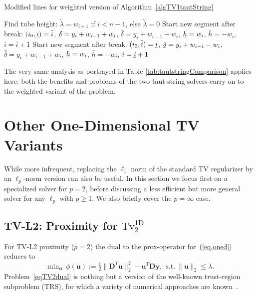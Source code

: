 \documentclass[twoside,11pt]{article}
\newcommand{\vu}{\bm{u}}       \newcommand{\vuh}{\hat{\bm{u}}}        \newcommand{\uh}{\hat{u}}    \newcommand{\vut}{\tilde{\bm{u}}}       \newcommand{\ut}{\tilde{u}}
\newcommand{\vy}{\bm{y}}       \newcommand{\vyh}{\hat{\bm{y}}}        \newcommand{\yh}{\hat{y}}    \newcommand{\vyt}{\tilde{\bm{y}}}       \newcommand{\yt}{\tilde{y}}
\newcommand{\md}{\bm{D}}
\newcommand{\mynorm}[2]{\| {#1} \|_{#2}}
\newcommand{\norm}[2]{\mynorm{#1}{#2}}
\newcommand{\enorm}[1]{\mynorm{#1}{2}}
\newcommand{\nlmin}{\min\nolimits}
\newcommand{\half}{\tfrac{1}{2}}
\newcommand{\tvell}{\text{Tv}}
\newcommand{\oned}{\text{1D}}
\newcommand{\ubar}[1]{\underaccent{\bar}{#1}}
\numberwithin{equation}{section}
\numberwithin{theorem}{section}
\begin{document}
\begin{algorithm}[htp]\small
 \caption{\small Modified lines for weighted version of Algorithm~\ref{algTV1tautString}}
 \label{algTV1tautStringWeighted}
 \begin{algorithmic}[1]
   \makeatletter
   \setcounter{ALG@line}{2}
   \makeatother
   \State\hskip12pt Find tube height: $\tilde \lambda = w_{i+1}$ if $i < n-1$, else $\tilde \lambda = 0$
   \makeatletter
   \setcounter{ALG@line}{7}
   \makeatother
     \State\hskip12pt Start new segment after break: $(i_0, \ubar i) = \bar i$, $\ubar \delta = y_i + w_{i-1} + w_i$, $\bar \delta = y_i + w_{i-1} - w_i$, $\ubar h = w_i$, $\bar h = -w_i$, $i = \bar i+1$
   \makeatletter
   \setcounter{ALG@line}{14}
   \makeatother
     \State\hskip12pt Start new segment after break: $(i_0, \bar i) = \ubar i$, $\ubar \delta = y_i + w_{i-1} - w_i$, $\bar \delta = y_i + w_{i-1} + w_i$, $\ubar h = w_i$, $\bar h = -w_i$, $i = \ubar i + 1$
 \end{algorithmic}
\end{algorithm}

The very same analysis as portrayed in Table \ref{tab:tautstringComparison} applies here: both the benefits and problems of the two taut-string solvers carry on to the weighted variant of the problem.

\section{Other One-Dimensional TV Variants}
\label{sec:tvoneothers}
While more infrequent, replacing the $\ell_1$ norm of the standard TV regularizer by an $\ell_p$-norm version can also be useful. In this section we focus first on a specialized solver for $p=2$, before discussing a less efficient but more general solver for any $\ell_p$ with $p \geq 1$. We also briefly cover the $p = \infty$ case.

\subsection{TV-L2: Proximity for $\tvell_2^{\oned}$}
\label{sec:tvl2}
For TV-L2 proximity ($p=2$) the dual to the prox-operator for~(\ref{eq.oned}) reduces to
\begin{equation}
  \label{eqTV2dual}
  \nlmin_{\vu}\ \phi(\vu) := \half\enorm{\md^T\vu}^2 - \vu^T\md\vy,\ \ \text{s.t.}\ \norm{\vu}{2} \le \lambda.
\end{equation}
Problem~\eqref{eqTV2dual} is nothing but a version of the well-known trust-region subproblem (TRS), for which a variety of numerical approaches are known~\citep{Conn}.
\end{document}
